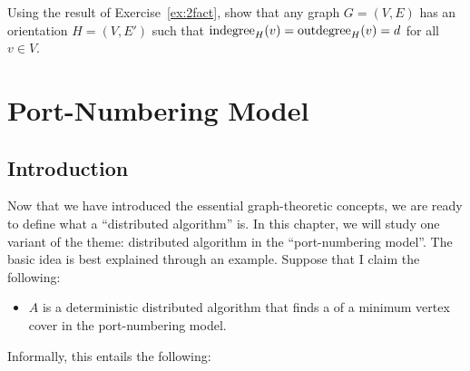 \begin{ex}[orientations]
    Using the result of Exercise~\ref{ex:2fact}, show that any  graph $G = (V,E)$ has an orientation $H = (V,E')$ such that $\operatorname{indegree}_H(v) = \operatorname{outdegree}_H(v) = d$ for all $v \in V$.
\end{ex}


\chapter{Port-Numbering Model}

\section{Introduction}

Now that we have introduced the essential graph-theoretic concepts, we are ready to define what a ``distributed algorithm'' is. In this chapter, we will study one variant of the theme: distributed algorithm in the ``port-numbering model''. The basic idea is best explained through an example. Suppose that I claim the following:
\begin{itemize}
    \item $A$ is a deterministic distributed algorithm that finds a  of a minimum vertex cover in the port-numbering model.
\end{itemize}
Informally, this entails the following:
